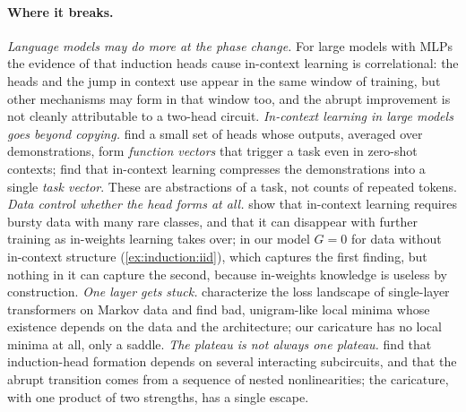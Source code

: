 \begin{refsection}
\paragraph{Where it breaks.} \emph{Language models may do more at the phase change.} For large models with MLPs the evidence of \textcite{OlssonEtAl2022} that induction heads cause in-context learning is correlational: the heads and the jump in context use appear in the same window of training, but other mechanisms may form in that window too, and the abrupt improvement is not cleanly attributable to a two-head circuit. \emph{In-context learning in large models goes beyond copying.} \Textcite{ToddEtAl2024} find a small set of heads whose outputs, averaged over demonstrations, form \emph{function vectors} that trigger a task even in zero-shot contexts; \textcite{HendelEtAl2023} find that in-context learning compresses the demonstrations into a single \emph{task vector}. These are abstractions of a task, not counts of repeated tokens. \emph{Data control whether the head forms at all.} \Textcite{ChanEtAl2022} show that in-context learning requires bursty data with many rare classes, and \textcite{SinghEtAl2023} that it can disappear with further training as in-weights learning takes over; in our model $G=0$ for data without in-context structure (\cref{ex:induction:iid}), which captures the first finding, but nothing in it can capture the second, because in-weights knowledge is useless by construction. \emph{One layer gets stuck.} \Textcite{MakkuvaEtAl2025} characterize the loss landscape of single-layer transformers on Markov data and find bad, unigram-like local minima whose existence depends on the data and the architecture; our caricature has no local minima at all, only a saddle. \emph{The plateau is not always one plateau.} \Textcite{SinghEtAl2024} find that induction-head formation depends on several interacting subcircuits, and \textcite{Reddy2024} that the abrupt transition comes from a sequence of nested nonlinearities; the caricature, with one product of two strengths, has a single escape.


\end{refsection}
